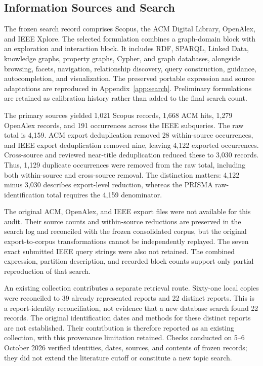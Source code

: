 \documentclass[manuscript,review,screen]{acmart}
\begin{document}
\subsection{Information Sources and Search}
The frozen search record comprises Scopus, the ACM Digital Library, OpenAlex, and IEEE Xplore. The selected formulation combines a graph-domain block with an exploration and interaction block. It includes RDF, SPARQL, Linked Data, knowledge graphs, property graphs, Cypher, and graph databases, alongside browsing, facets, navigation, relationship discovery, query construction, guidance, autocompletion, and visualization. The preserved portable expression and source adaptations are reproduced in Appendix~\ref{app:search}. Preliminary formulations are retained as calibration history rather than added to the final search count.

The primary sources yielded 1,021 Scopus records, 1,668 ACM hits, 1,279 OpenAlex records, and 191 occurrences across the IEEE subqueries. The raw total is 4,159. ACM export deduplication removed 28 within-source occurrences, and IEEE export deduplication removed nine, leaving 4,122 exported occurrences. Cross-source and reviewed near-title deduplication reduced these to 3,030 records. Thus, 1,129 duplicate occurrences were removed from the raw total, including both within-source and cross-source removal. The distinction matters: 4,122 minus 3,030 describes export-level reduction, whereas the PRISMA raw-identification total requires the 4,159 denominator.

The original ACM, OpenAlex, and IEEE export files were not available for this audit. Their source counts and within-source reductions are preserved in the search log and reconciled with the frozen consolidated corpus, but the original export-to-corpus transformations cannot be independently replayed. The seven exact submitted IEEE query strings were also not retained. The combined expression, partition description, and recorded block counts support only partial reproduction of that search.

An existing collection contributes a separate retrieval route. Sixty-one local copies were reconciled to 39 already represented reports and 22 distinct reports. This is a report-identity reconciliation, not evidence that a new database search found 22 records. The original identification dates and methods for these distinct reports are not established. Their contribution is therefore reported as an existing collection, with this provenance limitation retained. Checks conducted on 5--6 October 2026 verified identities, dates, sources, and contents of frozen records; they did not extend the literature cutoff or constitute a new topic search.
\end{document}
